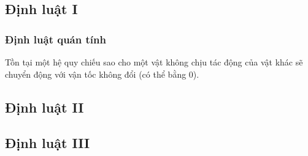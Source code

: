 \subsection{Định luật I}
\begin{frame}
    \frametitle{Định luật quán tính}
    \begin{tcolorbox}[colback=blue!10, colframe=blue!50!black, title=Hệ quy chiếu quán tính]
        Tồn tại một hệ quy chiếu sao cho một vật không chịu tác động của vật khác sẽ chuyển động với vận tốc không đổi (có thể bằng 0).
    \end{tcolorbox}
\end{frame}
\subsection{Định luật II}
\subsection{Định luật III}
